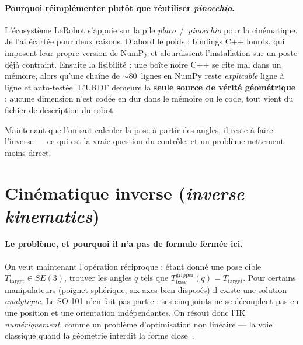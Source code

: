 \paragraph{Pourquoi réimplémenter plutôt que réutiliser \textit{pinocchio}.}
L'écosystème LeRobot s'appuie sur la pile \textit{placo}~/~\textit{pinocchio}
pour la cinématique. Je l'ai écartée pour deux raisons. D'abord le poids :
bindings C++ lourds, qui imposent leur propre version de NumPy et alourdissent
l'installation sur un poste déjà contraint. Ensuite la lisibilité : une boîte
noire C++ se cite mal dans un mémoire, alors qu'une chaîne de $\sim$80~lignes en
NumPy reste \emph{explicable} ligne à ligne et auto-testée. L'URDF demeure la
\textbf{seule source de vérité géométrique} : aucune dimension n'est codée en
dur dans le mémoire ou le code, tout vient du fichier de description du robot.

Maintenant que l'on sait calculer la pose à partir des angles, il reste à faire
l'inverse — ce qui est la vraie question du contrôle, et un problème nettement
moins direct.

\section{Cinématique inverse (\textit{inverse kinematics})}
\label{sec:ik}

\paragraph{Le problème, et pourquoi il n'a pas de formule fermée ici.} On veut
maintenant l'opération réciproque : étant donné une pose cible
$T_{\text{target}} \in SE(3)$, trouver les angles $q$ tels que
$T_{\text{base}}^{\text{gripper}}(q) = T_{\text{target}}$. Pour certains
manipulateurs (poignet sphérique, six axes bien disposés) il existe une solution
\emph{analytique}. Le SO-101 n'en fait pas partie : ses cinq joints ne se
découplent pas en une position et une orientation indépendantes. On résout donc
l'IK \emph{numériquement}, comme un problème d'optimisation non linéaire — la
voie classique quand la géométrie interdit la forme close~\cite{siciliano_robotics_2009}.

